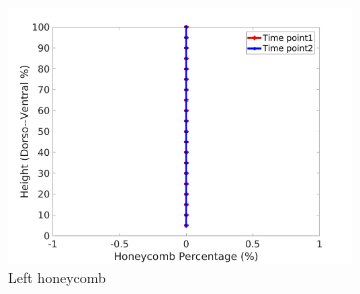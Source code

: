 \begin{figure}[H]
\begin{subfigure}{.42\linewidth}
  \includegraphics[width=\linewidth,trim={{.0\wd0} {.0\wd0} {.0\wd0} {.0\wd0}},clip]{Appendix/Image_AppexA/DorsoToVentral/IPF10LeftLungHoneycombDiseaseDorsoToVentral.jpg} %
  \caption{Left honeycomb}
  \label{fig:IPF10DiseaseDorsoToVentral-e} 
\end{subfigure} 
\begin{subfigure}{.42\linewidth}%

\end{subfigure}
\end{figure}
